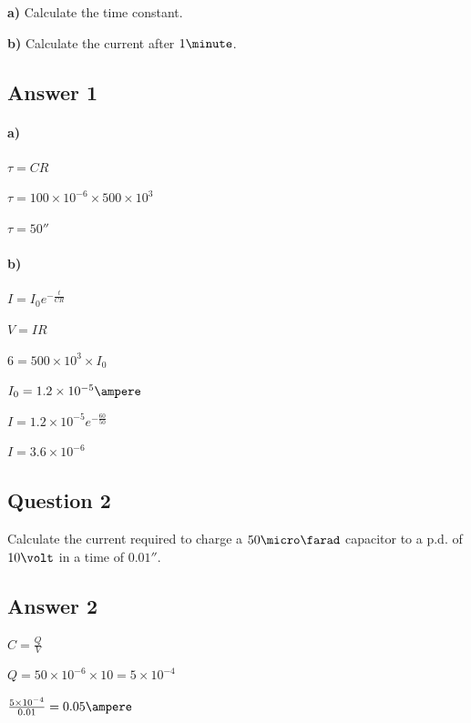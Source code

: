 \documentclass{article}
\begin{document}
{\bf a)} Calculate the time constant.

{\bf b)} Calculate the current after $1\minute$.

\subsection*{Answer 1}

\paragraph{a)}
\setlength\parindent{20pt}
$\tau = CR$

$\tau = 100\times10^{-6} \times 500\times10^3$

$\tau = 50\second$

\paragraph{b)}
\setlength\parindent{20pt}

$I = I_0e^{-\frac{t}{CR}}$

$V=IR$

$6 = 500\times10^3 \times I_0$

$I_0 = 1.2\times10^{-5}\ampere$

$I = 1.2\times10^{-5}e^{-\frac{60}{50}}$

$I = 3.6\times10^{-6}$ 

\subsection*{Question 2}

Calculate the current required to charge a $50\micro\farad$ capacitor to a p.d.
of $10\volt$ in a time of $0.01\second$.

\subsection*{Answer 2}
\setlength\parindent{0pt}
$C = \frac{Q}{V}$

$Q = 50\times10^{-6}\times10 = 5\times10^{-4}$

$\frac{5\times10^{-4}}{0.01} = 0.05\ampere$
\end{document}
